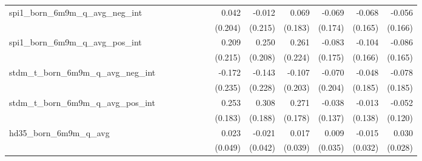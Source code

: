 \begin{tabular}{lrrrrrrrrrrrr}
spi1\_born\_6m9m\_q\_avg\_neg\_int          &              &              &              &              &              &              &        0.042 &       -0.012 &        0.069 &       -0.069 &       -0.068 &       -0.056 \\ 
                                            &              &              &              &              &              &              &      (0.204) &      (0.215) &      (0.183) &      (0.174) &      (0.165) &      (0.166) \\ 
spi1\_born\_6m9m\_q\_avg\_pos\_int          &              &              &              &              &              &              &        0.209 &        0.250 &        0.261 &       -0.083 &       -0.104 &       -0.086 \\ 
                                            &              &              &              &              &              &              &      (0.215) &      (0.208) &      (0.224) &      (0.175) &      (0.166) &      (0.165) \\ 
stdm\_t\_born\_6m9m\_q\_avg\_neg\_int       &              &              &              &              &              &              &       -0.172 &       -0.143 &       -0.107 &       -0.070 &       -0.048 &       -0.078 \\ 
                                            &              &              &              &              &              &              &      (0.235) &      (0.228) &      (0.203) &      (0.204) &      (0.185) &      (0.185) \\ 
stdm\_t\_born\_6m9m\_q\_avg\_pos\_int       &              &              &              &              &              &              &        0.253 &        0.308 &        0.271 &       -0.038 &       -0.013 &       -0.052 \\ 
                                            &              &              &              &              &              &              &      (0.183) &      (0.188) &      (0.178) &      (0.137) &      (0.138) &      (0.120) \\ 
hd35\_born\_6m9m\_q\_avg                    &              &              &              &              &              &              &        0.023 &       -0.021 &        0.017 &        0.009 &       -0.015 &        0.030 \\ 
                                            &              &              &              &              &              &              &      (0.049) &      (0.042) &      (0.039) &      (0.035) &      (0.032) &      (0.028) \\ 

\end{tabular}
